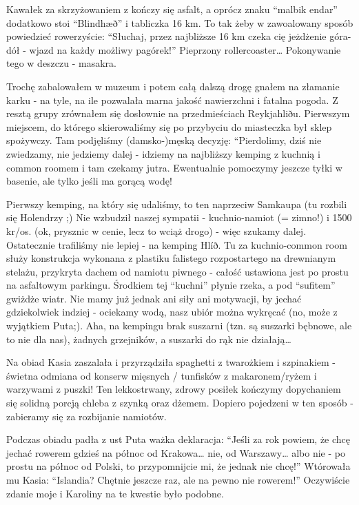 Kawałek za skrzyżowaniem  z  kończy się asfalt, a oprócz znaku “malbik endar” dodatkowo stoi “Blindhæð” i tabliczka 16 km. To tak żeby w zawoalowany sposób powiedzieć rowerzyście: “Słuchaj, przez najbliższe 16 km czeka cię jeżdżenie góra-dół - wjazd na każdy możliwy pagórek!” Pieprzony rollercoaster… Pokonywanie tego w deszczu - masakra.


Trochę zabalowałem w muzeum i potem całą dalszą drogę gnałem na złamanie karku - na tyle, na ile pozwalała marna jakość nawierzchni i fatalna pogoda. Z resztą grupy zrównałem się dosłownie na przedmieściach Reykjahliðu. Pierwszym miejscem, do którego skierowaliśmy się po przybyciu do miasteczka był sklep spożywczy. Tam podjęliśmy (damsko-)męską decyzję: “Pierdolimy, dziś nie zwiedzamy, nie jedziemy dalej - idziemy na najbliższy kemping z kuchnią i common roomem i tam czekamy jutra. Ewentualnie pomoczymy jeszcze tyłki w basenie, ale tylko jeśli ma gorącą wodę!

Pierwszy kemping, na który się udaliśmy, to ten naprzeciw Samkaupa  (tu rozbili się Holendrzy ;) Nie wzbudził naszej sympatii - kuchnio-namiot (= zimno!) i 1500 kr/os. (ok, prysznic w cenie, lecz to wciąż drogo) - więc szukamy dalej. Ostatecznie trafiliśmy nie lepiej - na kemping Hlíð. Tu za kuchnio-common room służy konstrukcja wykonana z plastiku falistego rozpostartego na drewnianym stelażu, przykryta dachem od namiotu piwnego - całość ustawiona jest po prostu na asfaltowym parkingu. Środkiem tej “kuchni” płynie rzeka, a pod “sufitem” gwiżdże wiatr. Nie mamy już jednak ani siły ani motywacji, by jechać gdziekolwiek indziej - ociekamy wodą, nasz ubiór można wykręcać (no, może z wyjątkiem Puta;). Aha, na kempingu brak suszarni (tzn. są suszarki bębnowe, ale to nie dla nas), żadnych grzejników, a suszarki do rąk nie działają…

Na obiad Kasia zaszalała i przyrządziła spaghetti z twarożkiem i szpinakiem - świetna odmiana od konserw mięsnych / tunfisków z makaronem/ryżem i warzywami z puszki! Ten lekkostrwany, zdrowy posiłek kończymy dopychaniem się solidną porcją chleba z szynką oraz dżemem. Dopiero pojedzeni w ten sposób - zabieramy się za rozbijanie namiotów.


Podczas obiadu padła z ust Puta ważka deklaracja: “Jeśli za rok powiem, że chcę jechać rowerem gdzieś na północ od Krakowa… nie, od Warszawy… albo nie - po prostu na północ od Polski, to przypomnijcie mi, że jednak nie chcę!” Wtórowała mu Kasia: “Islandia? Chętnie jeszcze raz, ale na pewno nie rowerem!” Oczywiście zdanie moje i Karoliny na te kwestie było podobne.

